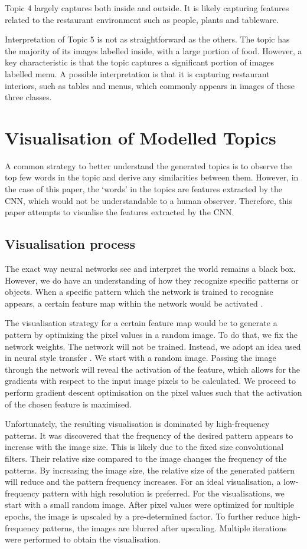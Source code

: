 \documentclass{article}
\begin{document}
Topic 4 largely captures both inside and outside. It is likely capturing features related to the restaurant environment such as people, plants and tableware. 

Interpretation of Topic 5 is not as straightforward as the others. The topic has the majority of its images labelled inside, with a large portion of food. However, a key characteristic is that the topic captures a significant portion of images labelled menu. A possible interpretation is that it is capturing restaurant interiors, such as tables and menus, which commonly appears in images of these three classes.

\section{Visualisation of Modelled Topics}
A common strategy to better understand the generated topics is to observe the top few words in the topic and derive any similarities between them. However, in the case of this paper, the `words' in the topics are features extracted by the CNN, which would not be understandable to a human observer. Therefore, this paper attempts to visualise the features extracted by the CNN. 

\subsection{Visualisation process}
The exact way neural networks see and interpret the world remains a black box. However, we do have an understanding of how they recognize specific patterns or objects. When a specific pattern which the network is trained to recognise appears, a certain feature map within the network would be activated \cite{visualcnn}. 

The visualisation strategy for a certain feature map would be to generate a pattern by optimizing the pixel values in a random image. To do that, we fix the network weights. The network will not be trained. Instead, we adopt an idea used in neural style transfer \cite{nstyletransfer}. We start with a random image. Passing the image through the network will reveal the activation of the feature, which allows for the gradients with respect to the input image pixels to be calculated. We proceed to perform gradient descent optimisation on the pixel values such that the activation of the chosen feature is maximised.

Unfortunately, the resulting visualisation is dominated by high-frequency patterns. It was discovered that the frequency of the desired pattern appears to increase with the image size. This is likely due to the fixed size convolutional  filters. Their relative size compared to the image changes the frequency of the patterns. By increasing the image size, the relative size of the generated pattern will reduce and the pattern frequency increases. For an ideal visualisation, a low-frequency pattern with high resolution is preferred. For the visualisations, we start with a small random image. After pixel values were optimized for multiple epochs, the image is upscaled by a pre-determined factor. To further reduce high-frequency patterns, the images are blurred after upscaling. Multiple iterations were performed to obtain the visualisation.
\end{document}
